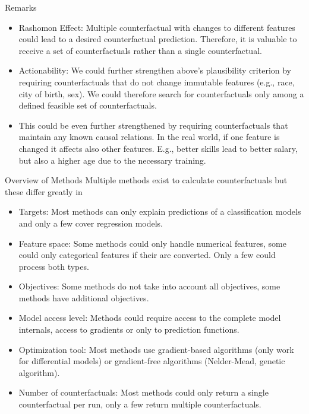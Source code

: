 \documentclass[11pt,compress,t,notes=noshow, xcolor=table]{beamer}
\begin{document}
\begin{vbframe}{Remarks}
	\begin{itemize}
		\item Rashomon Effect: Multiple counterfactual with changes to different features could lead to a desired counterfactual prediction. Therefore, it is valuable to receive a set of counterfactuals rather than a single counterfactual. 
		\item Actionability: We could further strengthen above's plausibility criterion by requiring counterfactuals that do not change immutable features (e.g., race, city of birth, sex). We could therefore search for counterfactuals only among a defined feasible set of counterfactuals. 
		\item This could be even further strengthened by requiring counterfactuals that maintain any known causal relations. In the real world, if one feature is changed it affects also other features. E.g., better skills lead to better salary, but also a higher age due to the necessary training. 
	\end{itemize}
	
\end{vbframe}

\begin{vbframe}{Overview of Methods}
	Multiple methods exist to calculate counterfactuals but these differ greatly in 
	\begin{itemize}
		\item Targets: Most methods can only explain predictions of a classification models and only a few cover regression models. 
		\item Feature space: Some methods could only handle numerical features, some could only categorical features if their are converted. Only a few could process both types. 
		\item Objectives: Some methods do not take into account all objectives, some methods have additional objectives. 
		\item Model access level: Methods could require access to the complete model internals, access to gradients or only to prediction functions. 
		\item Optimization tool: Most methods use gradient-based algorithms (only work for differential models) or gradient-free algorithms (Nelder-Mead, genetic algorithm). 
		\item Number of counterfactuals: Most methods could only return a single counterfactual per run, only a few return multiple counterfactuals.
	\end{itemize}
\end{vbframe}
\end{document}
